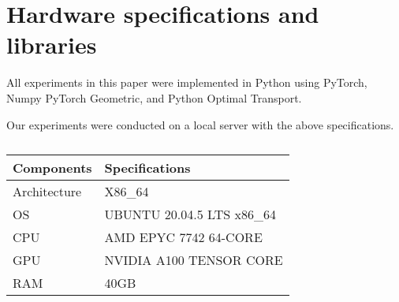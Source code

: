 \newpage
\section{Hardware specifications and libraries}

\noindent All experiments in this paper were implemented in Python using PyTorch, Numpy PyTorch Geometric, and Python Optimal Transport. 

\noindent Our experiments were conducted on a local server with the above specifications. 


\begin{table}[ht]\label{tab:afrc_orc_heuristic}
\footnotesize
\centering
\begin{tabular}{|l|l|}
\hline
\textbf{Components} & \textbf{Specifications} \\
\hline
Architecture & X86\_64 \\
OS & UBUNTU 20.04.5 LTS x86\_64 \\
CPU & AMD EPYC 7742 64-CORE \\
GPU & NVIDIA A100 TENSOR CORE \\
RAM & 40GB\\
\hline
\end{tabular}
\caption{}
\end{table}